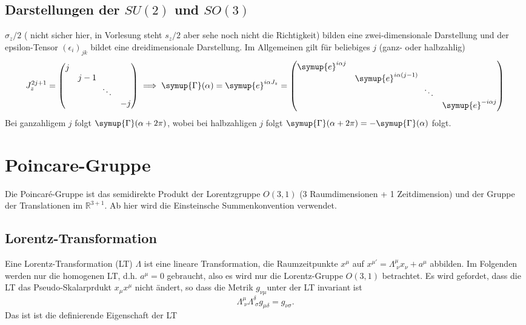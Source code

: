 \documentclass[
  captions=tableheading,  %
  titlepage=firstiscover, %
]{scrartcl}
\begin{document}
\subsection{Darstellungen der \texorpdfstring{$SU(2)$}{PDFstring} und \texorpdfstring{$SO(3)$}{PDFstring}}
$\sigma_z/2$ ({\color{red} nicht sicher hier, in Vorlesung steht $s_z/2$ 
aber sehe noch nicht die Richtigkeit}) bilden eine zwei-dimensionale Darstellung und 
der epsilon-Tensor $(\epsilon_i)_{jk}$ bildet eine dreidimensionale Darstellung.
Im Allgemeinen gilt für beliebiges $j$ (ganz- oder halbzahlig) 
\begin{equation*}
  J_z^{2j+1} = 
  \begin{pmatrix}
    j & & &  \\
    & j - 1 & & \\
    & & \! \!  \ddots & \\
    & & & -j
  \end{pmatrix}
  \implies \symup{\Gamma}(\alpha) = \symup{e}^{i\alpha J_z} = 
  \begin{pmatrix}
    \symup{e}^{i\alpha j} & & &  \\
    & \symup{e}^{i\alpha (j-1)} & & \\
    & & \! \!  \ddots & \\
    & & & \symup{e}^{- i\alpha j}
  \end{pmatrix}
\end{equation*}
Bei ganzahligem $j$ folgt $\symup{\Gamma}(\alpha +2\pi)$, wobei bei halbzahligen $j$ folgt $\symup{\Gamma}(\alpha + 2\pi) = - 
\symup{\Gamma}(\alpha)$ folgt.
\section{Poincare-Gruppe}
Die Poincaré-Gruppe ist das semidirekte Produkt der Lorentzgruppe 
$O(3,1)$ (3 Raumdimensionen + 1 Zeitdimension) und der Gruppe der Translationen im ${\mathbb {R}}^{{3+1}}$.
Ab hier wird die Einsteinsche Summenkonvention verwendet.
\subsection{Lorentz-Transformation}
\label{sub:LT}
Eine Lorentz-Transformation (LT) $\Lambda$ ist eine lineare Transformation, die 
Raumzeitpunkte $x^{\mu}$  auf  $x^{\mu ' } = \Lambda_{\; \nu}^{\mu} x_{\nu} + a^{\mu}$ abbilden.
Im Folgenden werden nur die homogenen LT, d.h. $a^{\mu} = 0$ gebraucht, also es wird nur die Lorentz-Gruppe 
$O(3,1)$ betrachtet.
Es wird gefordet, dass die LT das Pseudo-Skalarprdukt $x_{\mu}x^{\mu}$ nicht ändert, so dass die Metrik $g_{\nu \mu}$unter 
der LT invariant ist 
\begin{equation*}
  \Lambda_{\; \nu}^{\mu} \Lambda_{\; \sigma}^{\delta} g_{\mu \delta} = g_{\nu \sigma}.
\end{equation*}
Das ist ist die definierende Eigenschaft der LT
\end{document}
